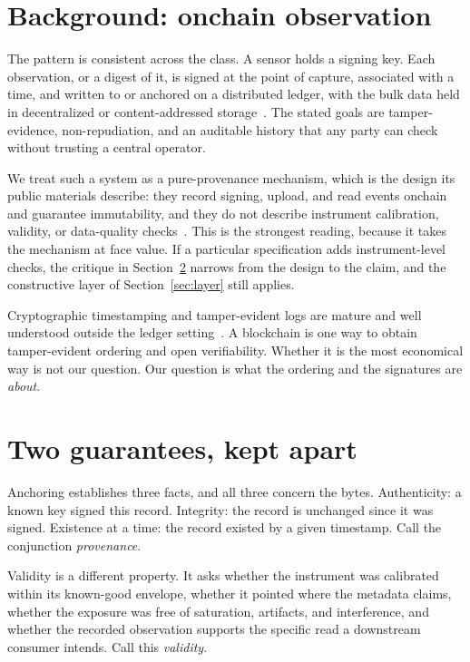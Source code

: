 \documentclass[conference]{IEEEtran}
\begin{document}
\section{Background: onchain observation}\label{sec:background}
The pattern is consistent across the class. A sensor holds a signing key. Each
observation, or a digest of it, is signed at the point of capture, associated
with a time, and written to or anchored on a distributed ledger, with the bulk
data held in decentralized or content-addressed storage~\cite{merkle}. The stated
goals are tamper-evidence, non-repudiation, and an auditable history that any
party can check without trusting a central operator.

We treat such a system as a pure-provenance mechanism, which is the design its
public materials describe: they record signing, upload, and read events onchain
and guarantee immutability, and they do not describe instrument calibration,
validity, or data-quality checks~\cite{skymapper}. This is the strongest reading,
because it takes the mechanism at face value. If a particular specification adds
instrument-level checks, the critique in Section~\ref{sec:distinction} narrows
from the design to the claim, and the constructive layer of
Section~\ref{sec:layer} still applies.

Cryptographic timestamping and tamper-evident logs are mature and well understood
outside the ledger setting~\cite{rfc3161,merkle}. A blockchain is one way to
obtain tamper-evident ordering and open verifiability. Whether it is the most
economical way is not our question. Our question is what the ordering and the
signatures are \emph{about}.

\section{Two guarantees, kept apart}\label{sec:distinction}
Anchoring establishes three facts, and all three concern the bytes.
Authenticity: a known key signed this record. Integrity: the record is unchanged
since it was signed. Existence at a time: the record existed by a given
timestamp. Call the conjunction \emph{provenance}.

Validity is a different property. It asks whether the instrument was calibrated
within its known-good envelope, whether it pointed where the metadata claims,
whether the exposure was free of saturation, artifacts, and interference, and
whether the recorded observation supports the specific read a downstream consumer
intends. Call this \emph{validity}.
\end{document}
